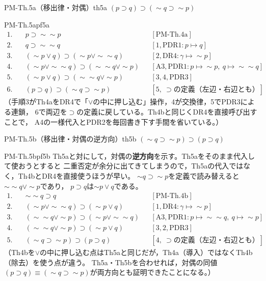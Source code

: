 \documentclass[autodetect-engine,dvi=dvipdfmx,ja=standard]{bxjsarticle}
\begin{document}
\begin{theorem}{PM-Th.5a（移出律・対偶）}{th5a}
\((p\supset q)\supset(\sim q\supset\sim p)\)
\end{theorem}
\begin{tproof}{PM-Th.5a}{pf5a}
\begin{align*}
  1.\quad & p\supset\sim\sim p && [\mathrm{PM\text{-}Th.4a}]\\
  2.\quad & q\supset\sim\sim q && [1,\mathrm{PDR1}: p\mapsto q]\\
  3.\quad & (\sim p\lor q)\supset(\sim p\lor\sim\sim q) && [2,\mathrm{DR4}: \gamma\mapsto\sim p]\\
  4.\quad & (\sim p\lor\sim\sim q)\supset(\sim\sim q\lor\sim p)
    && [\mathrm{A3},\mathrm{PDR1}: p\mapsto\sim p,\ q\mapsto\sim\sim q]\\
  5.\quad & (\sim p\lor q)\supset(\sim\sim q\lor\sim p) && [3,4,\mathrm{PDR3}]\\
  6.\quad & (p\supset q)\supset(\sim q\supset\sim p)
    && [5,\ \supset\text{の定義（左辺・右辺とも）}]
\end{align*}
（手順3がTh4aをDR4で「\(\lor\)の中に押し込む」操作，4が交換律，5でPDR3による連鎖，
6で両辺を\(\supset\)の定義に戻している。Th4bと同じくDR4を直接呼び出すことで，
A4の一様代入とPDR2を毎回書き下す手間を省いている。）
\end{tproof}

\begin{theorem}{PM-Th.5b（移出律・対偶の逆方向）}{th5b}
\((\sim q\supset\sim p)\supset(p\supset q)\)
\end{theorem}
\begin{tproof}{PM-Th.5b}{pf5b}
Th5aと対にして，対偶の\textbf{逆方向}を示す。Th5aをそのまま代入して使おうとすると
二重否定が余分に出てきてしまうので，Th5aの代入ではなく，Th4bとDR4を直接使うほうが早い。
\(\sim q\supset\sim p\)を定義で読み替えると\(\sim\sim q\lor\sim p\)であり，
\(p\supset q\)は\(\sim p\lor q\)である。
\begin{align*}
  1.\quad & \sim\sim q\supset q && [\mathrm{PM\text{-}Th.4b}]\\
  2.\quad & (\sim p\lor\sim\sim q)\supset(\sim p\lor q) && [1,\mathrm{DR4}: \gamma\mapsto\sim p]\\
  3.\quad & (\sim\sim q\lor\sim p)\supset(\sim p\lor\sim\sim q) && [\mathrm{A3},\mathrm{PDR1}: p\mapsto\sim\sim q,\ q\mapsto\sim p]\\
  4.\quad & (\sim\sim q\lor\sim p)\supset(\sim p\lor q) && [3,2,\mathrm{PDR3}]\\
  5.\quad & (\sim q\supset\sim p)\supset(p\supset q)
    && [4,\ \supset\text{の定義（左辺・右辺とも）}]
\end{align*}
（Th4bを\(\lor\)の中に押し込む点はTh5aと同じだが，Th4a（導入）ではなくTh4b（除去）を使う点が違う。
Th5a・Th5bを合わせれば，対偶の同値\((p\supset q)\equiv(\sim q\supset\sim p)\)が両方向とも証明できたことになる。）
\end{tproof}
\end{document}

